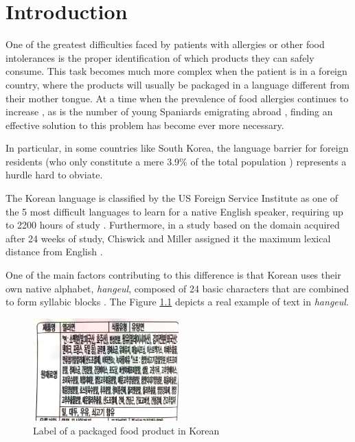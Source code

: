 \chapter{Introduction}
\label{chapter1}

One of the greatest difficulties faced by patients with allergies or other food intolerances is the proper identification of which products they can safely consume. This task becomes much more complex when the patient is in a foreign country, where the products will usually be packaged in a language different from their mother tongue. At a time when the prevalence of food allergies continues to increase \cite{tang_food_2017}, as is the number of young Spaniards emigrating abroad \cite{dominguez-mujica_international_2018}, finding an effective solution to this problem has become ever more necessary.
    
In particular, in some countries like South Korea, the language barrier for foreign residents (who only constitute a mere 3.9\% of the total population \cite{noauthor__2021-1}) represents a hurdle hard to obviate.
    
The Korean language is classified by the US Foreign Service Institute as one of the 5 most difficult languages to learn for a native English speaker, requiring up to 2200 hours of study \cite{noauthor_foreign_2021}. Furthermore, in a study based on the domain acquired after 24 weeks of study, Chiswick and Miller assigned it the maximum lexical distance from English \cite{chiswick_linguistic_2005}.

One of the main factors contributing to this difference is that Korean uses their own native alphabet, \textit{hangeul}, composed of 24 basic characters that are combined to form syllabic blocks \cite{noauthor_hangul_2021}. The Figure \ref{fig:label} depicts a real example of text in \textit{hangeul}.

\begin{figure}[h]
  \centering
  \includegraphics[width=0.5\textwidth]{Figures/label.jpg}
  \caption{%
    Label of a packaged food product in Korean
  }
  \label{fig:label}
\end{figure}

